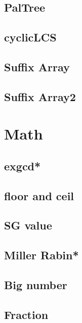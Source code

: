 \subsection{PalTree}

\subsection{cyclicLCS}

\subsection{Suffix Array}

\subsection{Suffix Array2}



\section{Math}
\subsection{exgcd*} %

\subsection{floor and ceil}

\subsection{SG value}

% 
\subsection{Miller Rabin*} %

\subsection{Big number}

\subsection{Fraction}

